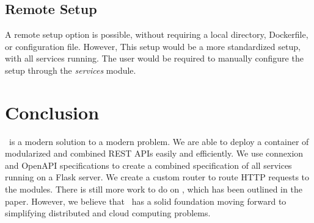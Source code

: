 \subsection{Remote Setup}

A remote setup option is possible, without requiring a local directory,
Dockerfile, or configuration file. However, This setup would be a more
standardized setup, with all services running. The user would be required
to manually configure the setup through the \textit{services} module.

\section{Conclusion}

\projectname~is a modern solution to a modern problem. We are able to deploy
a container of modularized and combined REST APIs easily and efficiently. We
use connexion and OpenAPI specifications to create a combined specification of
all services running on a Flask server. We create a custom router to route HTTP
requests to the modules. There is still more work to do on \projectname, which
has been outlined in the paper. However, we believe that \projectname~has
a solid foundation moving forward to simplifying distributed and cloud
computing problems.




